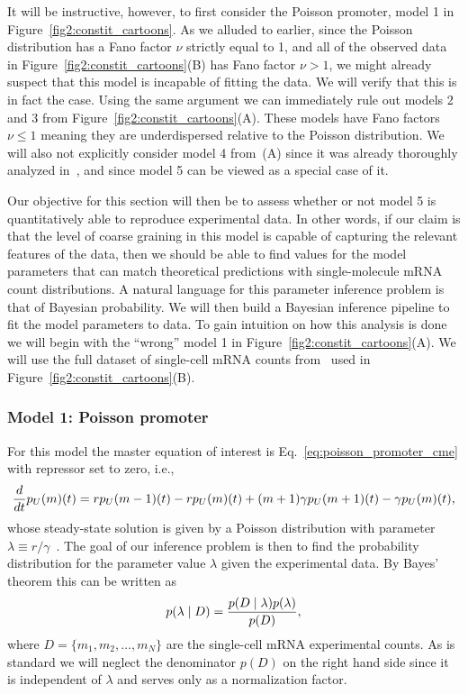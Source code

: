 It will be instructive, however, to first consider the Poisson promoter, model 1
in Figure~\ref{fig2:constit_cartoons}. As we alluded to earlier, since the
Poisson distribution has a Fano factor $\nu$ strictly equal to 1, and all of the
observed data in Figure~\ref{fig2:constit_cartoons}(B) has Fano factor $\nu>1$,
we might already suspect that this model is incapable of fitting the data. We
will verify that this is in fact the case. Using the same argument we can
immediately rule out models 2 and 3 from Figure~\ref{fig2:constit_cartoons}(A).
These models have Fano factors $\nu\le 1$ meaning they are underdispersed
relative to the Poisson distribution. We will also not explicitly consider model
4 from~(A) since it was already thoroughly analyzed
in~\cite{Razo-Mejia2020}, and since model 5 can be viewed as a special case of
it.

Our objective for this section will then be to assess whether or not model 5 is
quantitatively able to reproduce experimental data. In other words, if our claim
is that the level of coarse graining in this model is capable of capturing the
relevant features of the data, then we should be able to find values for the
model parameters that can match theoretical predictions with single-molecule
mRNA count distributions. A natural language for this parameter inference
problem is that of Bayesian probability. We will then build a Bayesian inference
pipeline to fit the model parameters to data. To gain intuition on how this
analysis is done we will begin with the ``wrong'' model 1 in
Figure~\ref{fig2:constit_cartoons}(A). We will use the full dataset of
single-cell mRNA counts from~\cite{Jones2014} used in
Figure~\ref{fig2:constit_cartoons}(B).

\subsubsection{Model 1: Poisson promoter}

For this model the master equation of interest is
Eq.~\ref{eq:poisson_promoter_cme} with repressor set to zero, i.e.,
\begin{equation}
{d\over dt}p_U(m)(t) = 
        rp_U(m-1)(t) 
        - rp_U(m)(t)
        + (m+1)\gamma p_U(m+1)(t) 
        - \gamma p_U(m)(t),
\end{equation}
whose steady-state solution is given by a Poisson distribution with parameter
$\lambda \equiv r / \gamma$~\cite{Sanchez2013}. The goal of our inference 
problem is then to find the probability distribution for the parameter value
$\lambda$ given the experimental data. By Bayes' theorem this can be written as
\begin{equation}
p(\lambda \mid D) = {p(D \mid \lambda) p(\lambda) \over p(D)},
\end{equation}
where $D = \{m_1, m_2, \ldots, m_N \}$ are the single-cell mRNA experimental
counts. As is standard we will neglect the denominator $p(D)$ on the right
hand side since it is independent of $\lambda$ and serves only as a
normalization factor.

